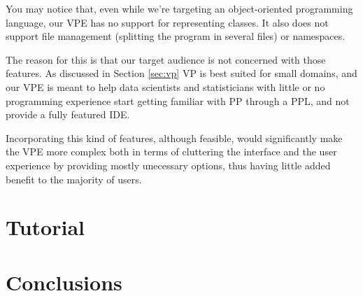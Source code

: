 You may notice that, even while we're targeting an object-oriented programming
language, our VPE has no support for representing classes. It also does not
support file management (splitting the program in several files) or namespaces.

The reason for this is that our target audience is not concerned with those features.
As discussed in Section \ref{sec:vp} VP is best suited for small domains, and our
VPE is meant to help data scientists and statisticians with little or no programming
experience start getting familiar with PP through a PPL, and not provide a
fully featured IDE.

Incorporating this kind of features, although feasible, would significantly
make the VPE more complex both in terms of cluttering the interface and the user
experience by providing mostly unecessary options, thus having little added
benefit to the majority of users.

\section{Tutorial}

\section{Conclusions}
